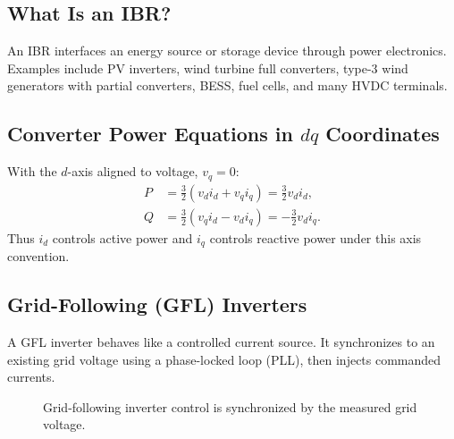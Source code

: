 \documentclass[11pt]{article}
\begin{document}
\subsection{What Is an IBR?}
An IBR interfaces an energy source or storage device through power electronics.
Examples include PV inverters, wind turbine full converters, type-3 wind
generators with partial converters, BESS, fuel cells, and many HVDC terminals.

\subsection{Converter Power Equations in $dq$ Coordinates}
With the $d$-axis aligned to voltage, $v_q=0$:
\begin{align}
P &= \frac{3}{2}(v_di_d+v_qi_q)=\frac{3}{2}v_di_d,\\
Q &= \frac{3}{2}(v_qi_d-v_di_q)=-\frac{3}{2}v_di_q.
\end{align}
Thus $i_d$ controls active power and $i_q$ controls reactive power under this
axis convention.

\subsection{Grid-Following (GFL) Inverters}
A GFL inverter behaves like a controlled current source. It synchronizes to an
existing grid voltage using a phase-locked loop (PLL), then injects commanded
currents.

\begin{figure}[h]
\centering
{}
\caption{Grid-following inverter control is synchronized by the measured grid voltage.}
\end{figure}
\end{document}
